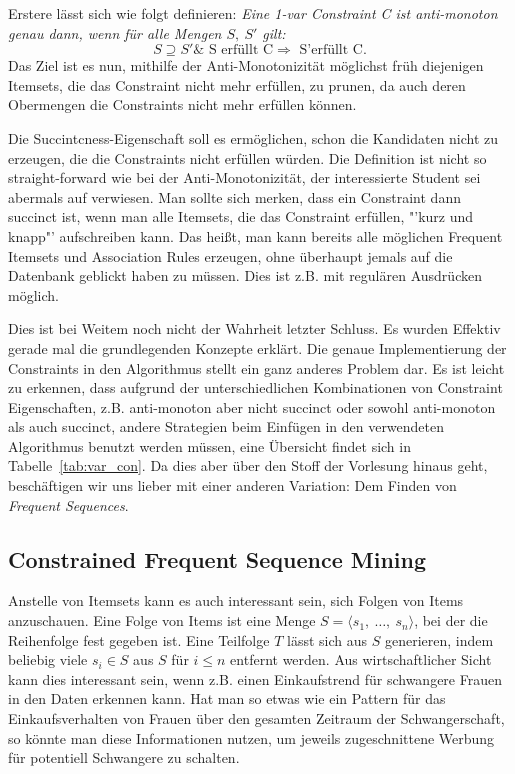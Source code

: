 Erstere lässt sich wie folgt definieren: \textit{Eine 1-var
Constraint C ist anti-monoton genau dann, wenn für alle
Mengen \(S,\ S'\) gilt:}
\[ S \supseteq S' \& \text{ S erfüllt C} \Longrightarrow
\text{ S'erfüllt C}. \]
Das Ziel ist es nun, mithilfe der Anti-Monotonizität möglichst
früh diejenigen Itemsets, die das Constraint nicht mehr
erfüllen, zu prunen, da auch deren Obermengen die 
Constraints nicht mehr erfüllen können.

Die Succintcness-Eigenschaft soll es ermöglichen, schon die
Kandidaten nicht zu erzeugen, die die Constraints nicht 
erfüllen würden. Die Definition ist nicht so straight-forward
wie bei der Anti-Monotonizität, der interessierte Student sei
abermals auf \citet{Ng98} verwiesen. Man sollte sich merken,
dass ein Constraint dann succinct ist, wenn man alle
Itemsets, die das Constraint erfüllen, "'kurz und knapp"'
aufschreiben kann. Das heißt, man kann bereits alle möglichen
Frequent Itemsets und Association Rules erzeugen, ohne überhaupt
jemals auf die Datenbank geblickt haben zu müssen. Dies ist z.B.
mit regulären Ausdrücken möglich.

Dies ist bei Weitem noch nicht der Wahrheit letzter Schluss. Es wurden
Effektiv gerade mal die grundlegenden Konzepte erklärt. Die genaue
Implementierung der Constraints in den Algorithmus stellt ein ganz
anderes Problem dar. Es ist leicht zu erkennen, dass aufgrund der
unterschiedlichen Kombinationen von Constraint Eigenschaften, z.B.
anti-monoton aber nicht succinct oder sowohl anti-monoton als auch 
succinct, andere Strategien beim Einfügen in den verwendeten Algorithmus
benutzt werden müssen,
eine Übersicht findet sich in Tabelle~\ref{tab:var_con}. 
Da dies aber über den Stoff der Vorlesung hinaus
geht, beschäftigen wir uns lieber mit einer anderen Variation: Dem Finden
von \textit{Frequent Sequences}.

\FloatBarrier
\subsection{Constrained Frequent Sequence Mining}
Anstelle von Itemsets kann es auch interessant sein, sich Folgen von Items
anzuschauen. Eine Folge von Items ist eine Menge \(S = \langle s_1,\ \dots,\ 
s_n\rangle\), bei der die Reihenfolge fest gegeben ist. Eine Teilfolge \(T\)
lässt sich aus \(S\) generieren, indem beliebig viele \(s_i\in S\) aus \(S\)
für \(i \leq n\) entfernt werden. Aus wirtschaftlicher Sicht kann dies
interessant sein, wenn z.B. einen Einkaufstrend für schwangere Frauen in den
Daten erkennen kann. Hat man so etwas wie ein Pattern für das Einkaufsverhalten
von Frauen über den gesamten Zeitraum der Schwangerschaft, so könnte man diese
Informationen nutzen, um jeweils zugeschnittene Werbung für potentiell Schwangere
zu schalten.

